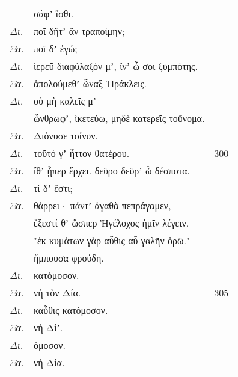 \documentclass[13pt]{article}
\begin{document}
\begin{greek}
\newpage
\begin{spacing}{1.5}
\begin{tabularx}{\textwidth}{@{}lXr@{}}
& σάφʼ ἴσθι. & \\
\textit{Δι.} & \hspace{4.5em}ποῖ δῆτʼ ἂν τραποίμην; &  \\
\textit{Ξα.} & \hspace{15em}ποῖ δʼ ἐγώ; &  \\
\textit{Δι.} & ἱερεῦ διαφύλαξόν μʼ, ἵνʼ ὦ σοι ξυμπότης. &  \\
\textit{Ξα.} & ἀπολούμεθʼ ὦναξ Ἡράκλεις. &  \\
\textit{Δι.} & \hspace{12em}οὐ μὴ καλεῖς μʼ &  \\
& ὦνθρωφʼ, ἱκετεύω, μηδὲ κατερεῖς τοὔνομα. &  \\
\textit{Ξα.} & Διόνυσε τοίνυν. & \\
\textit{Δι.} & \hspace{7em}τοῦτό γʼ ἧττον θατέρου. & 300 \\
\textit{Ξα.} & ἴθʼ ᾗπερ ἔρχει. δεῦρο δεῦρʼ ὦ δέσποτα. &  \\
\textit{Δι.} & τί δʼ ἔστι; &  \\
\textit{Ξα.} & \hspace{4.5em}θάρρει· πάντʼ ἀγαθὰ πεπράγαμεν, &  \\
& ἔξεστί θʼ ὥσπερ Ἡγέλοχος ἡμῖν λέγειν, &  \\
& "ἐκ κυμάτων γὰρ αὖθις αὖ γαλῆν ὁρῶ." &  \\
& ἥμπουσα φρούδη. & \\
\textit{Δι.} & \hspace{8em}κατόμοσον. & \\
\textit{Ξα.} & \hspace{13.5em}νὴ τὸν Δία. & 305 \\
\textit{Δι.} & καὖθις κατόμοσον. &  \\
\textit{Ξα.} & \hspace{8em}νὴ Δίʼ. &  \\
\textit{Δι.} & \hspace{11em}ὄμοσον. &  \\
\textit{Ξα.} & \hspace{15em}νὴ Δία. &  \\


\end{tabularx}
\end{spacing}


\end{greek}
\end{document}
